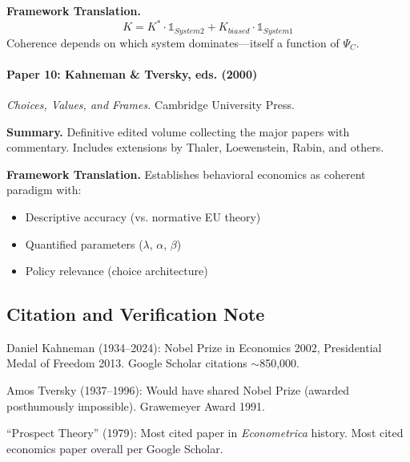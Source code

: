 \textbf{Framework Translation.}
\begin{equation}
K = K^* \cdot \mathbb{1}_{System2} + K_{biased} \cdot \mathbb{1}_{System1}
\end{equation}
Coherence depends on which system dominates—itself a function of $\Psi_C$.

\paragraph{Paper 10: Kahneman \& Tversky, eds. (2000)}

\textit{Choices, Values, and Frames.}
Cambridge University Press.

\textbf{Summary.}
Definitive edited volume collecting the major papers with commentary. 
Includes extensions by Thaler, Loewenstein, Rabin, and others.

\textbf{Framework Translation.}
Establishes behavioral economics as coherent paradigm with:
\begin{itemize}
    \item Descriptive accuracy (vs. normative EU theory)
    \item Quantified parameters ($\lambda$, $\alpha$, $\beta$)
    \item Policy relevance (choice architecture)
\end{itemize}

\subsection{Citation and Verification Note}

Daniel Kahneman (1934--2024): Nobel Prize in Economics 2002, Presidential Medal 
of Freedom 2013. Google Scholar citations $\sim$850,000.

Amos Tversky (1937--1996): Would have shared Nobel Prize (awarded posthumously 
impossible). Grawemeyer Award 1991.

``Prospect Theory'' (1979): Most cited paper in \textit{Econometrica} history.
Most cited economics paper overall per Google Scholar.

